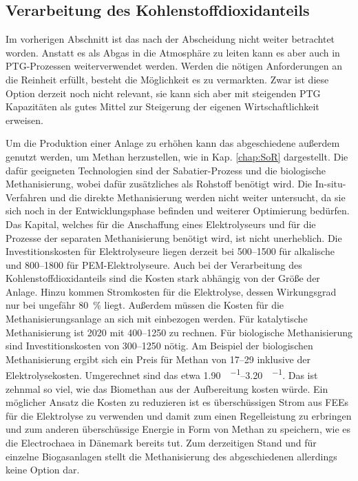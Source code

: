 \subsection{Verarbeitung des Kohlenstoffdioxidanteils}

Im vorherigen Abschnitt ist das  nach der Abscheidung nicht weiter betrachtet worden. Anstatt es als Abgas in die Atmosphäre zu leiten kann es aber auch in \gls{PTG}-Prozessen weiterverwendet werden. Werden die nötigen Anforderungen an die Reinheit erfüllt, besteht die Möglichkeit es zu vermarkten. Zwar ist diese Option derzeit noch nicht relevant, sie kann sich aber mit steigenden \gls{PTG} Kapazitäten als gutes Mittel zur Steigerung der eigenen Wirtschaftlichkeit erweisen. \parencite{UmBA19} \smallskip

Um die Produktion einer Anlage zu erhöhen kann das abgeschiedene  außerdem genutzt werden, um Methan herzustellen, wie in Kap. \ref{chap:SoR} dargestellt. Die dafür geeigneten Technologien sind der Sabatier-Prozess und die biologische Methanisierung, wobei dafür zusätzliches  als Rohstoff benötigt wird. Die In-situ-Verfahren und die direkte Methanisierung werden nicht weiter untersucht, da sie sich noch in der Entwicklungsphase befinden und weiterer Optimierung bedürfen. Das Kapital, welches für die Anschaffung eines Elektrolyseurs und für die Prozesse der separaten Methanisierung benötigt wird, ist nicht unerheblich. Die Investitionskosten für Elektrolyseure liegen derzeit bei \SIrange{500}{1500}{\Eurkw} für alkalische und \SIrange{800}{1800}{\Eurkw} für PEM-Elektrolyseure. Auch bei der Verarbeitung des Kohlenstoffdioxidanteils sind die Kosten stark abhängig von der Größe der Anlage. Hinzu kommen Stromkosten für die Elektrolyse, dessen Wirkungsgrad nur bei ungefähr \SI{80}{\percent} liegt. Außerdem müssen die Kosten für die Methanisierungsanlage an sich mit einbezogen werden. Für katalytische Methanisierung ist \SI{2020}{\relax} mit \SIrange{400}{1250}{\Eurkw} zu rechnen. Für biologische Methanisierung sind Investitionskosten von \SIrange{300}{1250}{\Eurkw} nötig. Am Beispiel der biologischen Methanisierung ergibt sich ein Preis für Methan von \SIrange{17}{29}{\ctkwh} inklusive der Elektrolysekosten. Umgerechnet sind das etwa \SIrange{1,90}{3,20}{\sieuro\per\normvol}. Das ist zehnmal so viel, wie das Biomethan aus der Aufbereitung kosten würde. Ein möglicher Ansatz die Kosten zu reduzieren ist es überschüssigen Strom aus \glspl{FEE} für die Elektrolyse zu verwenden und damit zum einen Regelleistung zu erbringen und zum anderen überschüssige Energie in Form von Methan zu speichern, wie es die Electrochaea in Dänemark bereits tut. Zum derzeitigen Stand und für einzelne Biogasanlagen stellt die Methanisierung des abgeschiedenen  allerdings keine Option dar. \parencite{Chaea20} \parencite{4.2b17} \parencite{dena2018b}


